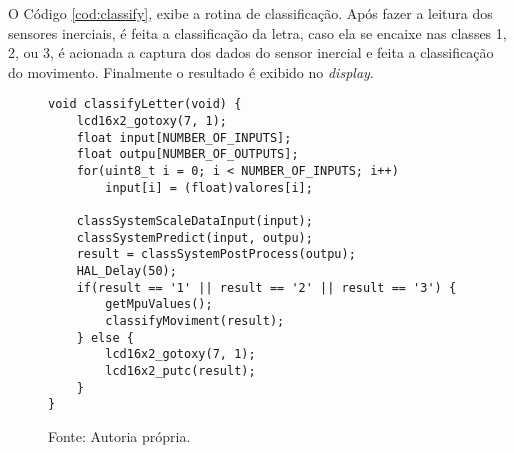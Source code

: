  O Código \ref{cod:classify}, exibe a rotina de classificação. Após fazer a leitura dos sensores inerciais, é feita a classificação da letra, caso ela se encaixe nas classes 1, 2, ou 3, é acionada a captura dos dados do sensor inercial e feita a classificação do movimento. Finalmente o resultado é exibido no \textit{display}.
\begin{figure}[H]
\begin{lstlisting}[breaklines, frame=single, caption=Função que executa a classificação das letras, style=CStyle, label=cod:classify]
void classifyLetter(void) {
	lcd16x2_gotoxy(7, 1);
	float input[NUMBER_OF_INPUTS];
	float outpu[NUMBER_OF_OUTPUTS];
	for(uint8_t i = 0; i < NUMBER_OF_INPUTS; i++)
		input[i] = (float)valores[i];
		
	classSystemScaleDataInput(input);
	classSystemPredict(input, outpu);
	result = classSystemPostProcess(outpu);
	HAL_Delay(50);
	if(result == '1' || result == '2' || result == '3') {
		getMpuValues();
		classifyMoviment(result);
	} else {
		lcd16x2_gotoxy(7, 1);
		lcd16x2_putc(result);
	}
}
\end{lstlisting}
\caption*{Fonte: Autoria própria.}
\end{figure}